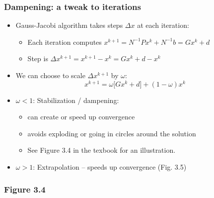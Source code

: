 \documentclass[bigger]{beamer}
\begin{document}
\begin{frame}%
\frametitle{Dampening: a tweak to iterations}

\begin{itemize}
\item Gauss-Jacobi algorithm takes steps $\Delta x$ at each iteration:

\begin{itemize}
\item Each iteration computes $x^{k+1}=N^{-1}Px^{k}+N^{-1}b=Gx^{k}+d$

\item Step is $\Delta x^{k+1}=x^{k+1}-x^{k}=Gx^{k}+d-x^{k}$
\end{itemize}

\item We can choose to scale $\Delta x^{k+1}$ by $\omega $:%
\begin{equation*}
x^{k+1}=\omega \lbrack Gx^{k}+d]+(1-\omega )x^{k}
\end{equation*}

\item $\omega <1$: Stabilization / dampening:

\begin{itemize}
\item can create or speed up convergence

\item avoids exploding or going in circles around the solution

\item See Figure 3.4 in the texbook for an illustration.
\end{itemize}

\item $\omega >1$: Extrapolation -- speeds up convergence (Fig. 3.5)
\end{itemize}


\end{frame}%

\begin{frame}%

\frametitle{Figure 3.4}



\end{frame}%
\end{document}
